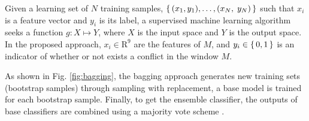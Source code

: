 \documentclass[3p,times,preprint]{elsarticle}
\begin{document}
Given a learning set of $N$ training samples, $\set{(x_{1},y_{1}), \ldots,(x_{N},\;y_{N})}$ such that $x_i$ is a feature vector and $y_i$ is its label, a supervised machine learning algorithm seeks a function $g : X \mapsto Y$, where $X$ is the input space and $Y$ is the output space. In the proposed approach, $x_i \in \mathrm{R}^9$ are the features of $M$, and $y_i \in \set{0,1}$ is an indicator of whether or not exists a conflict in the window $M$. 

As shown in Fig. \ref{fig:bagging}, the bagging approach generates new training sets  (bootstrap samples) through sampling with replacement, a base model is  trained for each bootstrap sample. Finally, to get the ensemble classifier, the outputs of base classifiers are combined using a majority vote scheme \citep{Li2015}. 

\end{document}
